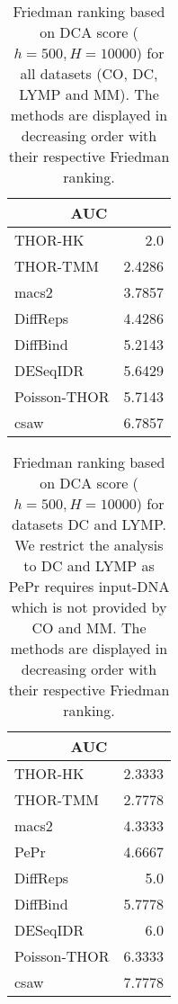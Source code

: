 \clearpage
\newpage
\begin{table}[h!]
\begin{center}
\renewcommand{\arraystretch}{1.2}
\begin{tabular}{ |lr| }
    \hline
    \multicolumn{2}{|c|}{\textbf{AUC}} \\
    \hline
    THOR-HK & 2.0 \\
    THOR-TMM & 2.4286 \\
    macs2 & 3.7857 \\
    DiffReps & 4.4286 \\
    DiffBind & 5.2143 \\
    DESeqIDR & 5.6429 \\
    Poisson-THOR & 5.7143 \\
    csaw & 6.7857 \\
    \hline
  \end{tabular}
\end{center}
\caption[Friedman ranking of DCA results]{Friedman ranking based on DCA score ($h=500, H=10000$) for all datasets (CO, DC, LYMP and MM). The methods are displayed in decreasing order with their respective Friedman ranking.}
\label{tab_res_real_with_rep_without_pepr}
\end{table}


\begin{table}[h!]
\begin{center}
\renewcommand{\arraystretch}{1.2}
  \begin{tabular}{ |lr| }
    \hline
    \multicolumn{2}{|c|}{\textbf{AUC}} \\
    \hline
    THOR-HK & 2.3333 \\
    THOR-TMM & 2.7778 \\
    macs2 & 4.3333 \\
    PePr & 4.6667 \\
    DiffReps & 5.0 \\
    DiffBind & 5.7778 \\
    DESeqIDR & 6.0 \\
    Poisson-THOR & 6.3333 \\
    csaw & 7.7778 \\
    \hline
  \end{tabular}
\end{center}
\caption[Friedman ranking of DCA results with PePr]{Friedman ranking based on DCA score ($h=500, H=10000$) for datasets DC and LYMP. We restrict the analysis to DC and LYMP as PePr requires input-DNA which is not provided by CO and MM. The methods are displayed in decreasing order with their respective Friedman ranking.}
\label{tab_res_real_with_rep_with_pepr}
\end{table}

